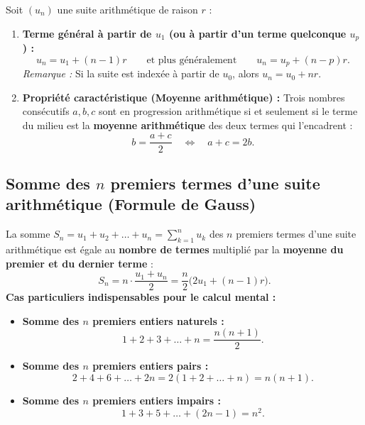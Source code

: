 \begin{theoreme}
Soit $(u_n)$ une suite arithmétique de raison $r$ :
\begin{enumerate}
    \item \textbf{Terme général à partir de $u_1$ (ou à partir d'un terme quelconque $u_p$) :}
    \[
        \boxed{u_n = u_1 + (n - 1)r} \qquad \text{et plus généralement} \qquad \boxed{u_n = u_p + (n - p)r}.
    \]
    \emph{Remarque :} Si la suite est indexée à partir de $u_0$, alors $u_n = u_0 + n r$.
    \item \textbf{Propriété caractéristique (Moyenne arithmétique) :} Trois nombres consécutifs $a, b, c$ sont en progression arithmétique si et seulement si le terme du milieu est la \textbf{moyenne arithmétique} des deux termes qui l'encadrent :
    \[
        \boxed{b = \frac{a + c}{2} \quad \Longleftrightarrow \quad a + c = 2b}.
    \]
\end{enumerate}
\end{theoreme}

\subsection{Somme des $n$ premiers termes d'une suite arithmétique (Formule de Gauss)}

\begin{theoreme}
La somme $S_n = u_1 + u_2 + \dots + u_n = \sum_{k=1}^n u_k$ des $n$ premiers termes d'une suite arithmétique est égale au \textbf{nombre de termes} multiplié par la \textbf{moyenne du premier et du dernier terme} :
\[
    \boxed{S_n = n \cdot \frac{u_1 + u_n}{2} = \frac{n}{2}\bigl(2u_1 + (n - 1)r\bigr)}.
\]
\textbf{Cas particuliers indispensables pour le calcul mental :}
\begin{itemize}
    \item \textbf{Somme des $n$ premiers entiers naturels :}
    \[
        \boxed{1 + 2 + 3 + \dots + n = \frac{n(n + 1)}{2}}.
    \]
    \item \textbf{Somme des $n$ premiers entiers pairs :}
    \[
        \boxed{2 + 4 + 6 + \dots + 2n = 2(1 + 2 + \dots + n) = n(n + 1)}.
    \]
    \item \textbf{Somme des $n$ premiers entiers impairs :}
    \[
        \boxed{1 + 3 + 5 + \dots + (2n - 1) = n^2}.
    \]
\end{itemize}
\end{theoreme}


